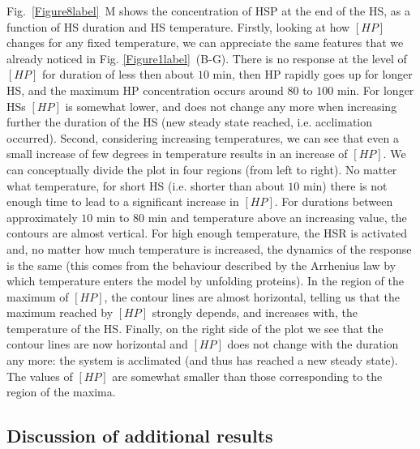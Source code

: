 \documentclass[oneside, 10pt, a4paper, twocolumn]{article}
\begin{document}
Fig.~\ref{Figure8label}~M shows the concentration of HSP at the end of the HS, as a function of HS duration and HS temperature. Firstly, looking at how $\left[HP\right]$ changes for any fixed temperature, we can appreciate the same features that we already noticed in Fig. \ref{Figure1label}~(B-G). There is no response at the level of $\left[HP\right]$ for duration of less then about $10$ min, then HP rapidly goes up for longer HS, and the maximum HP concentration occurs around $80$ to $100$ min. For longer HSs $\left[HP\right]$ is somewhat lower, and does not change any more when increasing further the duration of the HS (new steady state reached, i.e. acclimation occurred).
Second, considering increasing temperatures, we can see that even a small increase of few degrees in temperature results in an increase of $\left[HP\right]$. %
We can conceptually divide the plot in four regions (from left to right). No matter what temperature, for short HS (i.e. shorter than about $10$ min) there is not enough time to lead to a significant increase in $\left[HP\right]$. For durations between approximately $10$ min to $80$ min and temperature above an increasing value, the contours are almost vertical. For high enough temperature, the HSR is activated and, no matter how much temperature is increased, the dynamics of the response is the same (this comes from the behaviour described by the Arrhenius law  by which temperature enters the model by unfolding proteins). In the region of the maximum of $\left[HP\right]$, the contour lines are almost horizontal, telling us that the maximum reached by $\left[HP\right]$ strongly depends, and increases with, the temperature of the HS. Finally, on the right side of the plot we see that the contour lines are now horizontal and $\left[HP\right]$ does not change with the duration any more: the system is acclimated (and thus has reached a new steady state). The values of $\left[HP\right]$ are somewhat smaller than those corresponding to the region of the maxima.


\subsection{Discussion of additional results}
\end{document}
